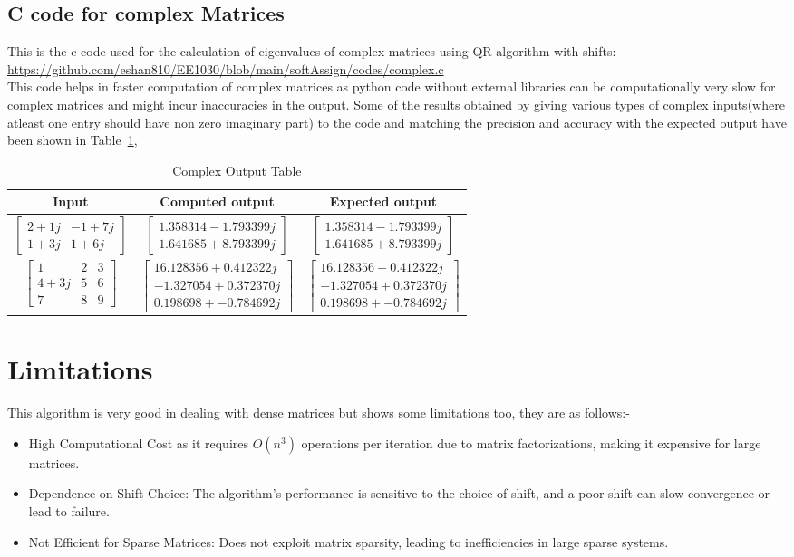 \documentclass[12pt]{article}
\newcommand{\myvec}[1]{\begin{bmatrix} #1 \end{bmatrix}}
\begin{document}
\subsection{C code for complex Matrices}
This is the c code used for the calculation of eigenvalues of complex matrices using QR algorithm with shifts: \\
\url{https://github.com/eshan810/EE1030/blob/main/softAssign/codes/complex.c}\\
This code helps in faster computation of complex matrices as python code without external libraries can be computationally very slow for complex matrices and might incur inaccuracies in the output.
Some of the results obtained by giving various types of complex inputs(where atleast one entry should have non zero imaginary part) to the code and matching the precision and accuracy with the expected output have been shown in Table~\ref{Table 2},
\begin{table}[H]
\centering
\begin{tabular}{|c|c|c|}
\hline
\textbf{Input} & \textbf{Computed output} & \textbf{Expected output} \\
\hline
$\myvec{2 + 1j & -1 + 7j\\1 + 3j&1 + 6j}$ & $\myvec{1.358314 - 1.793399j\\ 1.641685 + 8.793399j}$ & $\myvec{1.358314 - 1.793399j\\ 1.641685 + 8.793399j}$ \\ \hline
$\myvec{1&2&3\\4 + 3j&5&6\\7&8&9}$ & $\myvec{16.128356 + 0.412322j\\ -1.327054 + 0.372370j\\ 0.198698 + -0.784692j}$ & $\myvec{16.128356 + 0.412322j\\ -1.327054 + 0.372370j\\ 0.198698 + -0.784692j}$ \\ \hline
\end{tabular}
\caption{Complex Output Table}
\label{Table 2}
\end{table}
\section{Limitations}
This algorithm is very good in dealing with dense  matrices but shows some limitations too, they are as follows:-
\begin{itemize}
    \item High Computational Cost as it requires $O(n^3)$ operations per iteration due to matrix factorizations, making it expensive for large matrices.
    \item Dependence on Shift Choice: The algorithm's performance is sensitive to the choice of shift, and a poor shift can slow convergence or lead to failure.
    \item Not Efficient for Sparse Matrices: Does not exploit matrix sparsity, leading to inefficiencies in large sparse systems.
\end{itemize}
\end{document}

